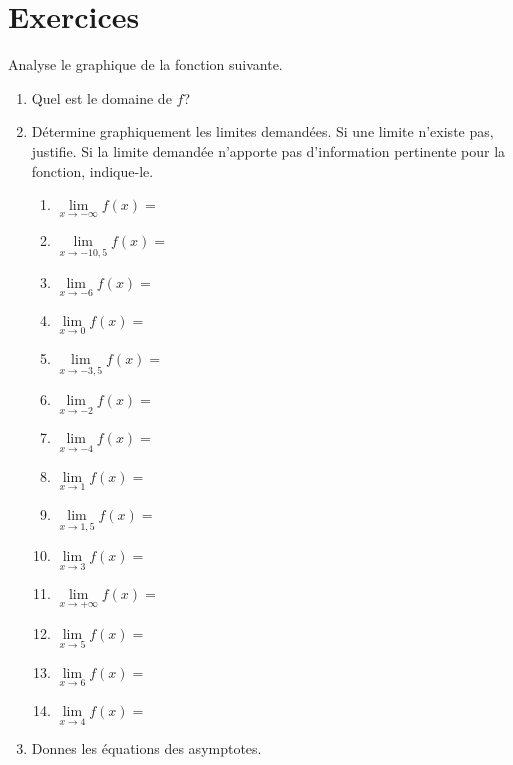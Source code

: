 \documentclass[a4paper,12pt]{report}
\newcommand{\minf}{-\infty}
\begin{document}
\section{Exercices}
\label{sec:orged07fa3}
\begin{exercice}
Analyse le graphique de la fonction suivante.
\begin{center}

\end{center}
\begin{enumerate}
\item Quel est le domaine de \(f\)? \dotfill
\item Détermine graphiquement les limites demandées. Si une limite
n'existe pas, justifie. Si la limite demandée n'apporte pas
d'information pertinente pour la fonction, indique-le.
\begin{center}
\par \setlength{\columnseprule}{0 pt}
          \begin{minipage}[t]{\linewidth}
          \begin{multicols}{3}

\begin{enumerate}
\item \(\lim\limits_{x\to \minf}f(x)=\) \dotfill
\item \(\lim\limits_{x\to -10,5}f(x)=\) \dotfill
\item \(\lim\limits_{x\to -6}f(x)=\) \dotfill
\item \(\lim\limits_{x\to 0}f(x)=\) \dotfill
\item \(\lim\limits_{x\to -3,5}f(x)=\) \dotfill
\item \(\lim\limits_{x\to -2}f(x)=\) \dotfill
\item \(\lim\limits_{x\to -4}f(x)=\) \dotfill
\item \(\lim\limits_{x\to 1}f(x)=\) \dotfill
\item \(\lim\limits_{x\to 1,5}f(x)=\) \dotfill
\item \(\lim\limits_{x\to 3}f(x)=\) \dotfill
\item \(\lim\limits_{x\to +\infty}f(x)=\) \dotfill
\item \(\lim\limits_{x\to 5}f(x)=\) \dotfill
\item \(\lim\limits_{x\to 6}f(x)=\) \dotfill
\item \(\lim\limits_{x\to 4}f(x)=\) \dotfill
\end{enumerate}


\end{multicols}\end{minipage}
\end{center}

\item Donnes les équations des asymptotes.
\end{enumerate}
\end{exercice}
\end{document}
